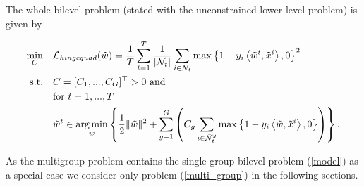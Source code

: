 The whole bilevel problem (stated with the unconstrained lower level problem) is given by

\begin{align}
\begin{split}
	\min_{C} \quad &  \mathcal{L}_{hingequad}(\tilde{w}) = \frac{1}{T}\sum_{t=1}^T\frac{1}{|\mathcal{N}_t|}\sum_{i \in \mathcal{N}_t}{\max\left\{1-y_i\left\langle \tilde{w}^t,\tilde{x}^i\right\rangle,0\right\}^2}\\
	\text{s.t.} \quad & C = [C_1,...,C_G]^{\top} > 0 \text{ and} \\
	& \text{for } t = 1,...,T \\
	& \tilde{w}^t \in \operatorname*{arg\,min}_{\tilde{w}}\left\{\frac{1}{2} \|\tilde{w}\|^2+\sum_{g=1}^G \left(C_g\sum_{i\in \bar{\mathcal{N}}_t^g}\max\left\{1-y_i\left\langle \tilde{w},\tilde{x}^i\right\rangle,0\right\}\right)\right\}.
\end{split}
\label{multi_group}
\end{align}

As the multigroup problem contains the single group bilevel problem (\ref{model}) as a special case we consider only problem (\ref{multi_group}) in the following sections.


%
%

%





